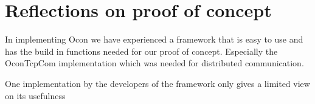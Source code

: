 \documentclass[../report.tex]{subfiles}
\begin{document}
\section{Reflections on proof of concept}



In implementing Ocon we have experienced a framework that is easy to use and has the build in functions needed for our proof of concept. Especially the OconTcpCom implementation which was needed for distributed communication.

One implementation by the developers of the framework only gives a limited view on its usefulness
\end{document}
